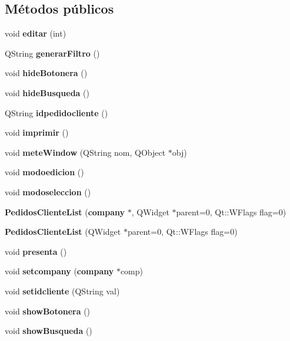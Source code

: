 \subsection*{M\'{e}todos p\'{u}blicos}
\begin{CompactItemize}
\item 
void {\bf editar} (int)\label{classPedidosClienteList_a0}

\item 
QString {\bf generar\-Filtro} ()
\item 
void {\bf hide\-Botonera} ()\label{classPedidosClienteList_a2}

\item 
void {\bf hide\-Busqueda} ()\label{classPedidosClienteList_a3}

\item 
QString {\bf idpedidocliente} ()\label{classPedidosClienteList_a4}

\item 
void {\bf imprimir} ()\label{classPedidosClienteList_a5}

\item 
void {\bf mete\-Window} (QString nom, QObject $\ast$obj)\label{classPedidosClienteList_a6}

\item 
void {\bf modoedicion} ()\label{classPedidosClienteList_a7}

\item 
void {\bf modoseleccion} ()\label{classPedidosClienteList_a8}

\item 
{\bf Pedidos\-Cliente\-List} ({\bf company} $\ast$, QWidget $\ast$parent=0, Qt::WFlags flag=0)\label{classPedidosClienteList_a9}

\item 
{\bf Pedidos\-Cliente\-List} (QWidget $\ast$parent=0, Qt::WFlags flag=0)\label{classPedidosClienteList_a10}

\item 
void {\bf presenta} ()
\item 
void {\bf setcompany} ({\bf company} $\ast$comp)\label{classPedidosClienteList_a12}

\item 
void {\bf setidcliente} (QString val)\label{classPedidosClienteList_a13}

\item 
void {\bf show\-Botonera} ()\label{classPedidosClienteList_a14}

\item 
void {\bf show\-Busqueda} ()\label{classPedidosClienteList_a15}

\end{CompactItemize}


